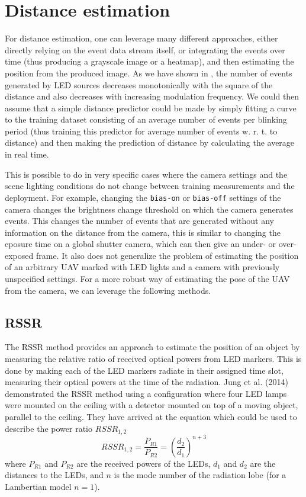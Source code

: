 
\chapter{Distance estimation\label{chap:p3p}}

For distance estimation, one can leverage many different approaches, either directly relying on the event data stream itself, or integrating the
events over time (thus producing a grayscale image or a heatmap), and then estimating the position from the produced image. As we have shown in , the number of events
generated by LED sources decreases monotonically with the square of the distance and also decreases with increasing modulation frequency.
We could then assume that a simple distance predictor could be made by simply fitting a curve to the training dataset consisting of an average
number of events per blinking period (thus training this predictor for average number of events w. r. t. to distance) and then making the prediction of distance by calculating the average in real time.

This is possible to do in very specific cases where the camera settings and the scene lighting conditions do not change between training measurements
and the deployment. For example, changing the \texttt{bias-on} or \texttt{bias-off} settings of the camera changes the brightness change threshold on
which the camera generates events.
This changes the number of events that are generated without any information on the distance from the camera, this is similar to changing the eposure
time on a global shutter camera, which can then give an under- or over-exposed frame.
It also does not generalize the problem of estimating the position of an arbitrary UAV marked with LED lights and a camera with previously unspecified
settings. For a more robust way of estimating the pose of the UAV from the camera, we can leverage the following methods.

\section{RSSR}

The \ac{RSSR} method provides an approach to estimate the position of an object by measuring the relative ratio of received optical powers from \ac{LED}
markers. This is done by making each of the \ac{LED} markers radiate in their assigned time slot, measuring their optical powers at the time of the
radiation. Jung et al. (2014) \cite{sooyongrssr} demonstrated the \ac{RSSR} method using a configuration where four LED lamps were mounted on the ceiling
with a detector mounted on top of a moving object, parallel to the ceiling.
They have arrived at the equation  which could be used to describe the power ratio $RSSR_{1,2}$
\begin{equation}
RSSR_{1,2} = \frac{P_{R1}}{P_{R2}} = \left( \frac{d_2}{d_1} \right)^{n+3}
\label{eq:rssr}
\end{equation}
where $P_{R1}$ and $P_{R2}$ are the received powers of the \ac{LED}s, $d_1$ and $d_2$ are the distances to the \ac{LED}s, and $n$ is the mode number of the radiation lobe (for a Lambertian model $n = 1$).

